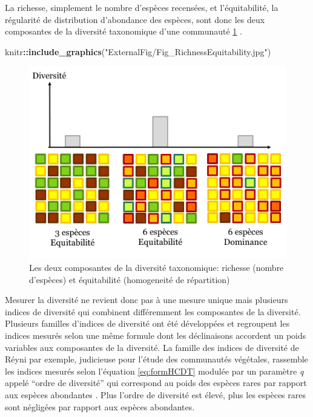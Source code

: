 \documentclass[
  11pt,
  french,
  A4paper,
  extrafontsizes,onecolumn,openright
  ]{memoir}
\newenvironment{Shaded}{\begin{snugshade}}{\end{snugshade}}
\newcommand{\KeywordTok}[1]{\textcolor[rgb]{0.13,0.29,0.53}{\textbf{#1}}}
\newcommand{\StringTok}[1]{\textcolor[rgb]{0.31,0.60,0.02}{#1}}
\newcommand{\OperatorTok}[1]{\textcolor[rgb]{0.81,0.36,0.00}{\textbf{#1}}}
\newcommand{\NormalTok}[1]{#1}
\begin{document}
La richesse, simplement le nombre d'espèces recensées, et
l'équitabilité, la régularité de distribution d'abondance des espèces,
sont donc les deux composantes de la diversité taxonomique d'une
communauté \ref{fig:RichEqu} \autocites{Whittaker1965}{Magurran2004}.

\begin{Shaded}
\begin{Highlighting}[]
\NormalTok{knitr}\OperatorTok{::}\KeywordTok{include_graphics}\NormalTok{(}\StringTok{"ExternalFig/Fig_RichnessEquitability.jpg"}\NormalTok{)}
\end{Highlighting}
\end{Shaded}

\begin{figure}

{\centering \includegraphics[width=0.6\linewidth]{ExternalFig/Fig_RichnessEquitability} 

}

\caption{Les deux composantes de la diversité taxonomique: richesse (nombre d'espèces) et équitabilité (homogeneité de répartition)}\label{fig:RichEqu}
\end{figure}

Mesurer la diversité ne revient donc pas à une mesure unique mais
plusieurs indices de diversité qui combinent différemment les
composantes de la diversité. Plusieurs familles d'indices de diversité
ont été développées et regroupent les indices mesurés selon une même
formule dont les déclinaisons accordent un poids variables aux
composantes de la diversité. La famille des indices de diversité de
Réyni par exemple, judicieuse pour l'étude des communautés végétales,
rassemble les indices mesurés selon l'équation \eqref{eq:formHCDT} modulée
par un paramètre \emph{q} appelé ``ordre de diversité'' qui correspond
au poids des espèces rares par rapport aux espèces abondantes
\autocite{Mendes2008}. Plus l'ordre de diversité est élevé, plus les
espèces rares sont négligées par rapport aux espèces abondantes.
\end{document}
